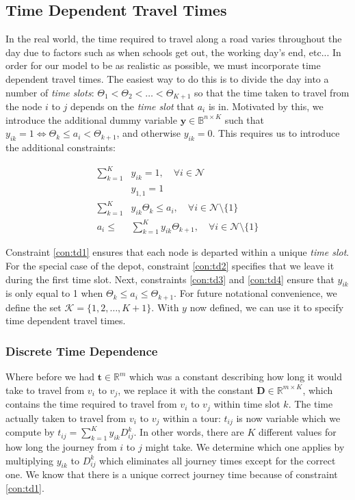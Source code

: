 \subsection{Time Dependent Travel Times}
\label{sec:time_dependent}
In the real world, the time required to travel along a road varies throughout the day due to factors such as when schools get out, the working day's end, etc... In order for our model to be as realistic as possible, we must incorporate time dependent travel times. The easiest way to do this is to divide the day into a number of \textit{time slots}: $ \Theta_1  <\Theta_2<\ldots <\Theta_{K+1}$ so that the time taken to travel from the node $i$ to $j$ depends on the \textit{time slot} that $a_i$ is in. Motivated by this, we introduce the additional dummy variable $\mathbf{y} \in \mathbb{B}^{n \times K}$ such that $y_{ik}=1 \Leftrightarrow \Theta_k \leq a_i < \Theta_{k+1}$, and otherwise $y_{ik} = 0$. This requires us to introduce the additional constraints:

\begin{align}
\sum \limits_{k = 1}^K &y_{ik} = 1, \quad \forall i \in \mathcal{N} \label{con:td1}\\
&y_{1,1}=1 \label{con:td2}\\
\sum \limits_{k=1}^K &y_{ik}\Theta_k \leq a_i, \quad \forall i \in \mathcal{N}\setminus \{1\}\label{con:td3}\\
a_i \leq &\sum \limits_{k=1}^K y_{ik}\Theta_{k+1}  , \quad \forall i \in \mathcal{N}\setminus \{1\}\label{con:td4}
\end{align}

Constraint \ref{con:td1} ensures that each node is departed within a unique \textit{time slot}. For the special case of the depot, constraint \ref{con:td2} specifies that we leave it during the first time slot. Next, constraints \ref{con:td3} and \ref{con:td4} ensure that $y_{ik}$ is only equal to 1 when $\Theta_k \leq a_i \leq \Theta_{k+1}$. For future notational convenience, we define the set $\mathcal{K} = \{1, 2, \ldots, K+1\}$.  With $y$ now defined, we can use it to specify time dependent travel times. 

\subsubsection{Discrete Time Dependence}
\label{sec:piece_const_travel}

Where before we had $\mathbf{t} \in \mathbb{R}^m$ which was a constant describing how long it would take to travel from $v_i$ to $v_j$, we replace it with the constant $\mathbf{D} \in \mathbb{R}^{m \times K}$, which contains the time required to travel from $v_i$ to $v_j$ within time slot $k$. The time actually taken to travel from $v_i$ to $v_j$ within a tour: $t_{ij}$ is now variable which we compute by $t_{ij} = \sum \limits_{k = 1}^K y_{ik} D^k_{ij}$. In other words, there are $K$ different values for how long the journey from $i$ to $j$ might take. We determine which one applies by multiplying $y_{ik}$ to $D^k_{ij}$ which eliminates all journey times except for the correct one. We know that there is a unique correct journey time because of constraint \ref{con:td1}.

